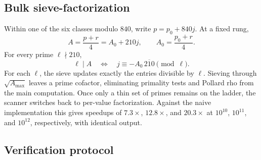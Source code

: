 \documentclass[11pt]{article}
\theoremstyle{definition}
\theoremstyle{remark}
\begin{document}
\subsection{Bulk sieve-factorization}\label{sec:bulk}

Within one of the six classes modulo $840$, write $p=p_0+840j$. At a fixed rung,
\begin{equation}\label{eq:apA}
A=\frac{p+r}{4}=A_0+210j, \qquad A_0=\frac{p_0+r}{4}.
\end{equation}
For every prime $\ell\nmid210$,
\[
\ell\mid A \quad\Longleftrightarrow\quad
j\equiv-A_0\,\overline{210}\pmod\ell.
\]
For each $\ell$, the sieve updates exactly the entries divisible by $\ell$. Sieving through
$\sqrt{A_{\max}}$ leaves a prime cofactor, eliminating primality tests and Pollard rho
from the main computation. Once only a thin set of primes remains on the ladder, the scanner
switches back to per-value factorization. Against the naive implementation this gives
speedups of $7.3\times$, $12.8\times$, and $20.3\times$ at $10^{10}$, $10^{11}$, and
$10^{12}$, respectively, with identical output.

\subsection{Verification protocol}\label{sec:protocol}
\end{document}
